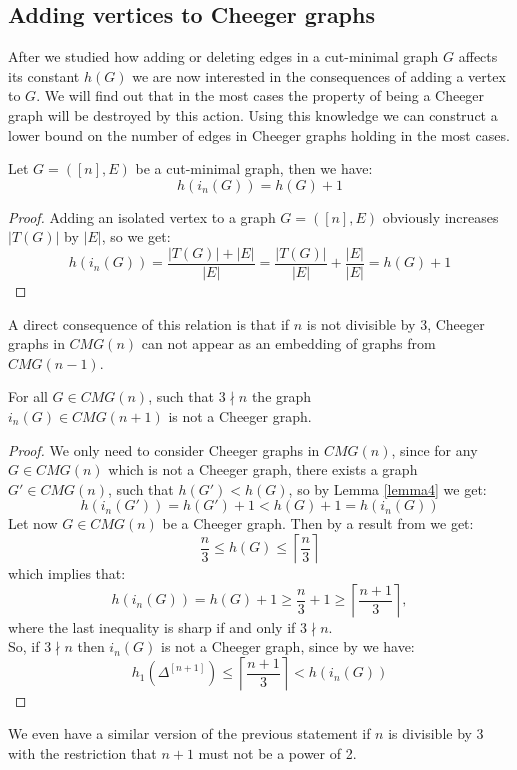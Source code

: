 \subsection{Adding vertices to Cheeger graphs}
After we studied how adding or deleting edges in a cut-minimal graph \(G\) affects its constant \(h(G)\) we are now interested in the consequences of adding a vertex to \(G\). We will find out that in the most cases the property of being a Cheeger graph will be destroyed by this action. Using this knowledge we can construct a lower bound on the number of edges in Cheeger graphs holding in the most cases.
\begin{lem}\label{lemma4}
Let \(G=([n],E)\) be a cut-minimal graph, then we have:
\[
h(i_n(G))=h(G)+1
\]
\begin{proof}
Adding an isolated vertex to a graph \(G=([n],E)\) obviously increases \(|T(G)|\) by \(|E|\), so we get:
\[
h(i_n(G))=\frac{|T(G)|+|E|}{|E|}=\frac{|T(G)|}{|E|}+\frac{|E|}{|E|}=h(G)+1
\]
\end{proof}
\end{lem}
A direct consequence of this relation is that if \(n\) is not divisible by 3, Cheeger graphs in \(CMG(n)\) can not appear as an embedding of graphs from \(CMG(n-1)\).
\begin{prop}\label{proposition4}
For all \(G\in CMG(n)\), such that \(3\nmid n\) the graph\\
\(i_n(G)\in CMG(n+1)\) is not a Cheeger graph.
\begin{proof}
We only need to consider Cheeger graphs in \(CMG(n)\), since for any\\
\(G\in CMG(n)\) which is not a Cheeger graph, there exists a graph \(G'\in CMG(n)\), such that \(h(G')<h(G)\), so by Lemma \ref{lemma4} we get:
\[
h(i_n(G'))=h(G')+1<h(G)+1=h(i_n(G))
\]
Let now \(G\in CMG(n)\) be a Cheeger graph. Then by a result from \cite{1} we get:
\[
\frac{n}{3}\leq h(G)\leq\left\lceil\frac{n}{3}\right\rceil
\]
which implies that:
\[
h(i_n(G))=h(G)+1\geq\frac{n}{3}+1\geq\left\lceil\frac{n+1}{3}\right\rceil,
\]
where the last inequality is sharp if and only if \(3\nmid n\).\\
So, if \(3\nmid n\) then \(i_n(G)\) is not a Cheeger graph, since by \cite{1} we have:
\[
h_1(\Delta^{[n+1]})\leq\left\lceil\frac{n+1}{3}\right\rceil<h(i_n(G))
\]
\end{proof}
\end{prop}
We even have a similar version of the previous statement if \(n\) is divisible by 3 with the restriction that \(n+1\) must not be a power of 2.
